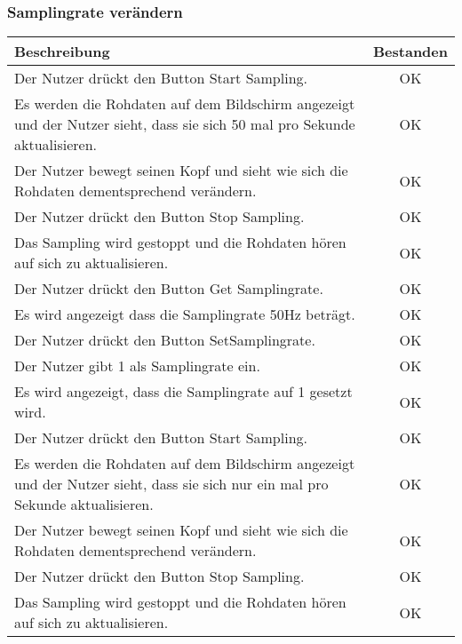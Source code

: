 \documentclass[a4paper,12pt]{article}
\begin{document}
\subsubsection{Samplingrate verändern}
\begin{tabular}{ | p{12cm} | c| }
	\hline
	\textbf{Beschreibung} & \textbf{Bestanden}\\
	\hline
	Der Nutzer drückt den Button \glqq{}Start Sampling\grqq{}. & OK\\
	\hline
	Es werden die Rohdaten auf dem Bildschirm angezeigt und der Nutzer sieht, dass sie sich 50 mal pro Sekunde aktualisieren. & OK\\
	\hline
	Der Nutzer bewegt seinen Kopf und sieht wie sich die Rohdaten dementsprechend verändern. & OK\\
	\hline
	Der Nutzer drückt den Button \glqq{}Stop Sampling\grqq{}. & OK \\
	\hline
	Das Sampling wird gestoppt und die Rohdaten hören auf sich zu aktualisieren. & OK \\
	\hline
	Der Nutzer drückt den Button \glqq{}Get Samplingrate\grqq{}. & OK\\
	\hline
	Es wird angezeigt dass die Samplingrate 50Hz beträgt. & OK\\
	\hline
	Der Nutzer drückt den Button \glqq{}SetSamplingrate\grqq{}. & OK\\
	\hline
	Der Nutzer gibt 1 als Samplingrate ein. & OK \\
	\hline
	Es wird angezeigt, dass die Samplingrate auf 1 gesetzt wird. & OK \\
	\hline
	Der Nutzer drückt den Button \glqq{}Start Sampling\grqq{}. & OK\\
	\hline
	Es werden die Rohdaten auf dem Bildschirm angezeigt und der Nutzer sieht, dass sie sich nur ein mal pro Sekunde aktualisieren. & OK\\
	\hline
	Der Nutzer bewegt seinen Kopf und sieht wie sich die Rohdaten dementsprechend verändern. & OK\\
	\hline
	Der Nutzer drückt den Button \glqq{}Stop Sampling\grqq{}. & OK \\
	\hline
	Das Sampling wird gestoppt und die Rohdaten hören auf sich zu aktualisieren. & OK \\
	\hline
\end{tabular}
\end{document}

